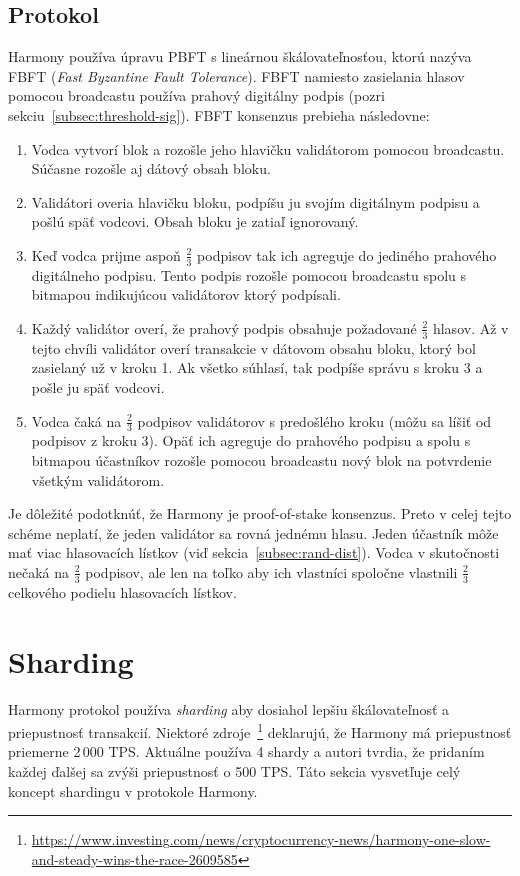 \subsection{Protokol}\label{subsec:fbft}
Harmony používa úpravu PBFT s lineárnou škálovateľnosťou, ktorú nazýva FBFT (\textit{Fast Byzantine Fault Tolerance}). FBFT namiesto zasielania hlasov pomocou broadcastu používa prahový digitálny podpis (pozri sekciu~\ref{subsec:threshold-sig}). FBFT konsenzus prebieha následovne:
\begin{enumerate}
	\item Vodca vytvorí blok a rozošle jeho hlavičku validátorom pomocou broadcastu. Súčasne rozošle aj dátový obsah bloku.
	\item Validátori overia hlavičku bloku, podpíšu ju svojím digitálnym podpisu a pošlú späť vodcovi. Obsah bloku je zatiaľ ignorovaný.
	\item Keď vodca prijme aspoň $\frac{2}{3}$ podpisov tak ich agreguje do jediného prahového digitálneho podpisu. Tento podpis rozošle pomocou broadcastu spolu s bitmapou indikujúcou validátorov ktorý podpísali.
	\item Každý validátor overí, že prahový podpis obsahuje požadované $\frac{2}{3}$ hlasov. Až v tejto chvíli validátor overí transakcie v dátovom obsahu bloku, ktorý bol zasielaný už v kroku 1. Ak všetko súhlasí, tak podpíše správu s kroku 3 a pošle ju späť vodcovi.
	\item Vodca čaká na $\frac{2}{3}$ podpisov validátorov s predošlého kroku (môžu sa líšiť od podpisov z kroku 3). Opäť ich agreguje do prahového podpisu a spolu s bitmapou účastníkov rozošle pomocou broadcastu nový blok na potvrdenie všetkým validátorom. 
\end{enumerate}
Je dôležité podotknúť, že Harmony je proof-of-stake konsenzus. Preto v celej tejto schéme neplatí, že jeden validátor sa rovná jednému hlasu. Jeden účastník môže mať viac hlasovacích lístkov (viď sekcia~\ref{subsec:rand-dist}). Vodca v skutočnosti nečaká na $\frac{2}{3}$ podpisov, ale len na toľko aby ich vlastníci spoločne vlastnili $\frac{2}{3}$ celkového podielu hlasovacích lístkov.

\section{Sharding}\label{sec:harmony-shards}

Harmony protokol používa \textit{sharding} aby dosiahol lepšiu škálovateľnosť a priepustnosť transakcií. Niektoré zdroje~\footnote{\url{https://www.investing.com/news/cryptocurrency-news/harmony-one-slow-and-steady-wins-the-race-2609585}} deklarujú, že Harmony má priepustnosť priemerne 2\,000 TPS. Aktuálne používa 4 shardy a autori tvrdia, že pridaním každej ďalšej sa zvýši priepustnosť o 500 TPS. Táto sekcia vysvetľuje celý koncept shardingu v protokole Harmony.

